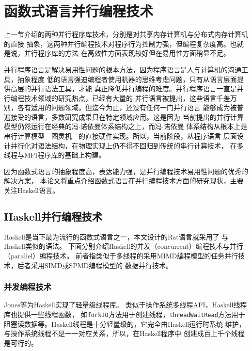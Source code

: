 \section{函数式语言并行编程技术}\label{sec:parallel-language}
上一节介绍的两种并行程序库技术，分别是对共享内存计算机与分布式内存计算机的直接
抽象，这两种并行编程技术对程序行为控制力强，但编程复杂度高。也就是说，并行程序库的方法
在高效性方面表现较好但在易用性方面稍显不足。

并行程序语言是解决易用性问题的根本方法，因为程序语言是人与计算机的沟通工具，抽象程度
低的语言强迫编程者使用机器的思维考虑问题，只有从语言层面提供高层的并行语法工具，才能
真正降低并行编程的难度。并行程序语言一直是并行编程技术领域的研究热点，已经有大量的
并行语言被提出，这些语言千差万别，各有适用的问题领域。但迄今为止，还没有任何一门并行语言
能够成为被普遍接受的语言，多数研究成果只在特定领域应用。这是因为
当前提出的并行计算模型仍然运行在经典的冯$\cdot{}$诺依曼体系结构之上，而冯$\cdot{}$诺依曼
体系结构从根本上是串行计算模型---图灵机---的直接硬件实现。所以，当前阶段，从程序语言
层面设计并行化对语法结构，在物理实现上仍不得不回归到传统的串行计算技术，
在多线程与MPI程序库的基础上构建。

因为函数式语言的抽象程度高，表达能力强，是并行编程技术易用性问题的优秀的解决方案，
本论文将重点介绍函数式语言在并行编程技术方面的研究现状，主要关注Haskell语言。

\subsection{Haskell并行编程技术}
Haskell是当下最为流行的函数式语言之一，本文设计的Rat语言就采用了
与Haskell类似的语法。
下面分别介绍Haskell的并发（concurrent）编程技术与并行（parallel）编程技术。
前者指类似于多线程的采用MIMD编程模型的任务并行技术，后者采用SIMD或SPMD编程模型的
数据并行技术。

\subsubsection{并发编程技术}
Jones等为Haskell实现了轻量级线程库。
类似于操作系统多线程API，Haskell线程库也提供一些线程函数，
如\texttt{forkIO}方法用于创建线程，\texttt{threadWaitRead}方法用于
阻塞读数据等。Haskell线程是十分轻量级的，它完全由Haskell运行时系统
维护，与操作系统线程不是一一对应关系，所以，在Haskell程序中
创建成百上千个线程是可行的。

